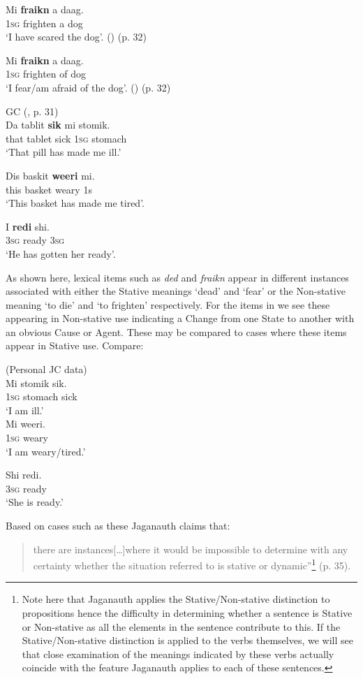 \ex
\gll Mi \textbf{fraikn}  a daag.\\
\textsc{1sg}  frighten  a dog\\
\glt `I have scared the dog'. (\DYNAMIC) (p.  32)

\ex
\gll Mi \textbf{fraikn} a daag.\\
          \textsc{1sg} frighten of dog\\
\glt `I fear/am afraid of the dog'. (\STATIVE) (p. 32) \z \z

\ea%
\label{ex:2:13}
GC (\citealt{Jaganauth1987}, p. 31)\\
\ea
\gll Da tablit \textbf{sik} mi stomik.\\
          that tablet sick \textsc{1sg} stomach\\
\glt `That pill has made me ill.'

\ex
\gll Dis baskit \textbf{weeri} mi.\\
          this basket weary 1s\\
\glt `This basket has made me tired'.

\ex
\gll I \textbf{redi} shi.\\
        \textsc{3sg} ready \textsc{3sg}\\
\glt `He has gotten her ready'.  
\z\z

As shown here, lexical items such as \textit{ded} and \textit{fraikn}
appear in different instances associated with either the Stative
meanings `dead' and `fear' or the Non-stative meaning `to die' and ‘to
frighten' respectively.  For the items in  we see these
appearing in Non-stative use indicating a Change from one State to
another with an obvious Cause or Agent.  These may be compared to
cases where these items appear in Stative use.  Compare:

\ea%
\label{ex:2:14}
(Personal JC data)\\
\ea
\gll Mi stomik sik.\\
\textsc{1sg} stomach sick\\
\glt  `I am ill.'\\
\ex
\gll  Mi weeri.\\
\textsc{1sg} weary \\
`I am weary/tired.'

\ex
\gll Shi redi.\\
		\textsc{3sg} ready\\
\glt `She is ready.'\z \z

Based on cases such as these Jaganauth claims that:

\begin{quote}
there are instances[…]where it would be impossible to determine with any
certainty whether the situation referred to is stative or
dynamic”\footnote{Note here that Jaganauth applies the
  Stative\slash Non-stative distinction to propositions hence the
  difficulty in determining whether a sentence is Stative or
  Non-stative as all the elements in the sentence contribute to
  this. If the Stative\slash Non-stative distinction is applied to the verbs
  themselves, we will see that close examination of the meanings
  indicated by these verbs actually coincide with the feature
  Jaganauth applies to each of these sentences.}  (p. 35).
\end{quote}

